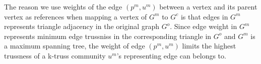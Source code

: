 The reason we use weights of the edge $(p^m, u^m)$ between a vertex and its parent vertex as references when mapping a vertex of $G^m$ to $G^c$ is that edges in $G^m$ represents triangle adjacency in the original graph $G^o$. Since edge weight in $G^m$ represents minimum edge trussniss in the corresponding triangle in $G^o$ and $G^m$ is a maximum spanning tree, the weight of edge $(p^m, u^m)$ limits the highest trussness of a k-truss community $u^m$'s representing edge can belongs to. 


